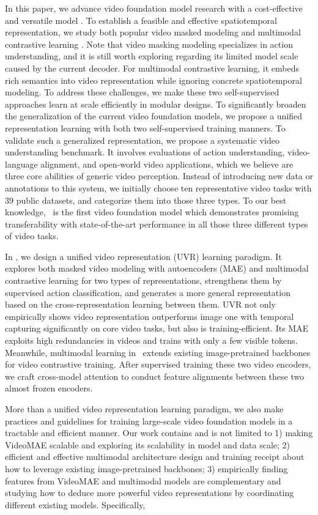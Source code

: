 In this paper, we advance video foundation model research with a cost-effective and versatile model \model. 
To establish a feasible and effective spatiotemporal representation, we study both popular video masked modeling \cite{mae,videomae} and multimodal contrastive learning \cite{CLIP,cpd}. Note that video masking modeling specializes in action understanding, and it is still worth exploring regarding its limited model scale caused by the current decoder. For multimodal contrastive learning, it embeds rich semantics into video representation while ignoring concrete spatiotemporal modeling. To address these challenges, we make these two self-supervised approaches learn at scale efficiently in modular designs.
To significantly broaden the generalization of the current video foundation models, we propose a unified representation learning with both two self-supervised training manners. To validate such a generalized representation, we propose a systematic video understanding benchmark. It involves evaluations of action understanding, video-language alignment, and open-world video applications, which we believe are three core abilities of generic video perception. Instead of introducing new data or annotations to this system, we initially choose ten representative video tasks with 39 public datasets, and categorize them into those three types. 
To our best knowledge, \model~is the first video foundation model which demonstrates promising transferability with state-of-the-art performance in all those three different types of video tasks.

In \model, we design a unified video representation (UVR) learning paradigm. It explores both masked video modeling with autoencoders (MAE) and multimodal contrastive learning for two types of representations, strengthens them by supervised action classification, and generates a more general representation based on the cross-representation learning between them.
UVR not only empirically shows video representation outperforms image one with temporal capturing significantly on core video tasks, but also is training-efficient. Its MAE exploits high redundancies in videos and trains with only a few visible tokens. Meanwhile, multimodal learning in \model~extends existing image-pretrained backbones for video contrastive training. After supervised training these two video encoders, we craft cross-model attention to conduct feature alignments between these two almost frozen encoders.

More than a unified video representation learning paradigm, we also make practices and guidelines for training large-scale video foundation models in a tractable and efficient manner. Our work contains and is not limited to 1) making VideoMAE scalable and exploring its scalability in model and data scale; 2) efficient and effective multimodal architecture design and training receipt about how to leverage existing image-pretrained backbones; 3) empirically finding features from VideoMAE and multimodal models are complementary and studying how to deduce more powerful video representations by coordinating different existing models. Specifically, 

